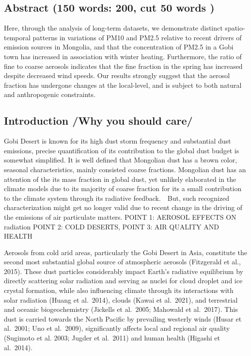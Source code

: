 \documentclass[
  11pt,
]{article}
\begin{document}
\subsection{Abstract (150 words: 200, cut 50 words
)}\label{abstract-150-words-200-cut-50-words}

Here, through the analysis of long-term datasets, we demonstrate
distinct spatio-temporal patterns in variations of PM10 and PM2.5
relative to recent drivers of emission sources in Mongolia, and that the
concentration of PM2.5 in a Gobi town has increased in association with
winter heating. Furthermore, the ratio of fine to coarse aerosols
indicates that the fine fraction in the spring has increased despite
decreased wind speeds. Our results strongly suggest that the aerosol
fraction has undergone changes at the local-level, and is subject to
both natural and anthropogenic constraints.

\newpage

\subsection{Introduction /Why you should
care/}\label{introduction-why-you-should-care}

Gobi Desert is known for its high dust storm frequency and substantial
dust emissions, precise quantification of its contribution to the global
dust budget is somewhat simplified. It is well defined that Mongolian
dust has a brown color, seasonal characteristics, mainly consisted
coarse fractions. Mongolian dust has an attention of the its mass
fraction in global dust, yet unlikely elaborated in the climate models
due to its majority of coarse fraction for its a small contribution to
the climate system through its radiative feedback.　But, such recognized
characterization might get no longer valid due to recent change in the
driving of the emissions of air particulate matters. POINT 1: AEROSOL
EFFECTS ON radiation POINT 2: COLD DESERTS, POINT 3: AIR QUALITY AND
HEALTH

Aerosols from cold arid areas, particularly the Gobi Desert in Asia,
constitute the second most substantial global source of atmospheric
aerosols (Fitzgerald et al., 2015). These dust particles considerably
impact Earth's radiative equilibrium by directly scattering solar
radiation and serving as nuclei for cloud droplet and ice crystal
formation, while also influencing climate through its interactions with
solar radiation (Huang et al.~2014), clouds (Kawai et al.~2021), and
terrestrial and oceanic biogeochemistry (Jickells et al.~2005; Mahowald
et al.~2017). This dust is carried towards the North Pacific by
prevailing westerly winds (Husar et al.~2001; Uno et al.~2009),
significantly affects local and regional air quality (Sugimoto et al.
2003; Jugder et al.~2011) and human health (Higashi et al.~2014).
\end{document}
